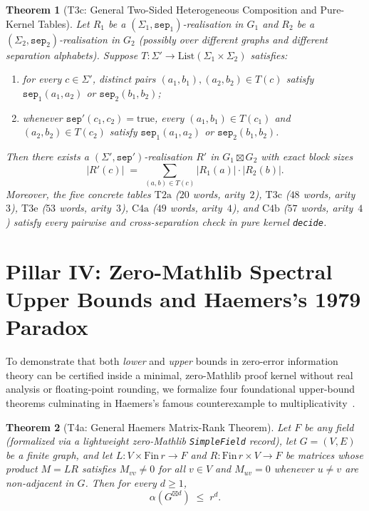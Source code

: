 \documentclass[11pt,reqno]{amsart}
\newtheorem{theorem}{Theorem}[section]
\theoremstyle{definition}
\newcommand{\sprod}{\boxtimes}
\newcommand{\lean}[1]{\nolinkurl{#1}}
\begin{document}
\begin{theorem}[T3c: General Two-Sided Heterogeneous Composition and Pure-Kernel Tables]\label{thm:t3c}
Let $R_1$ be a $(\Sigma_1,\texttt{sep}_1)$-realisation in $G_1$ and $R_2$ be a $(\Sigma_2,\texttt{sep}_2)$-realisation in $G_2$ (possibly over different graphs and different separation alphabets). Suppose $T : \Sigma' \to \mathrm{List}(\Sigma_1 \times \Sigma_2)$ satisfies:
\begin{enumerate}[label=(\roman*),leftmargin=2.2em]
  \item for every $c \in \Sigma'$, distinct pairs $(a_1,b_1),(a_2,b_2) \in T(c)$ satisfy $\texttt{sep}_1(a_1,a_2)$ or $\texttt{sep}_2(b_1,b_2)$;
  \item whenever $\texttt{sep}'(c_1,c_2)=\mathrm{true}$, every $(a_1,b_1)\in T(c_1)$ and $(a_2,b_2)\in T(c_2)$ satisfy $\texttt{sep}_1(a_1,a_2)$ or $\texttt{sep}_2(b_1,b_2)$.
\end{enumerate}
Then there exists a $(\Sigma',\texttt{sep}')$-realisation $R'$ in $G_1 \sprod G_2$ with exact block sizes
\[
  |R'(c)| \;=\; \sum_{(a,b)\in T(c)} |R_1(a)|\cdot |R_2(b)|.
\]
Moreover, the five concrete tables $\mathrm{T2a}$ ($20$ words, arity~$2$), $\mathrm{T3c}$ ($48$ words, arity~$3$), $\mathrm{T3e}$ ($53$ words, arity~$3$), $\mathrm{C4a}$ ($49$ words, arity~$4$), and $\mathrm{C4b}$ ($57$ words, arity~$4$) satisfy every pairwise and cross-separation check in pure kernel \texttt{decide}.
\end{theorem}

\section{Pillar IV: Zero-Mathlib Spectral Upper Bounds and Haemers's 1979 Paradox}\label{sec:pillar4}

To demonstrate that both \emph{lower} and \emph{upper} bounds in zero-error information theory can be certified inside a minimal, zero-Mathlib proof kernel without real analysis or floating-point rounding, we formalize four foundational upper-bound theorems culminating in Haemers's famous counterexample to multiplicativity~\cite{haemers1979some}.

\begin{theorem}[T4a: General Haemers Matrix-Rank Theorem]\label{thm:t4a}
Let $F$ be any field (formalized via a lightweight zero-Mathlib \lean{SimpleField} record), let $G=(V,E)$ be a finite graph, and let $L : V \times \mathrm{Fin}\,r \to F$ and $R : \mathrm{Fin}\,r \times V \to F$ be matrices whose product $M = LR$ satisfies $M_{vv} \neq 0$ for all $v \in V$ and $M_{uv} = 0$ whenever $u \neq v$ are non-adjacent in $G$. Then for every $d \ge 1$,
\[
  \alpha(G^{\sprod d}) \;\le\; r^d.
\]
\end{theorem}
\end{document}
